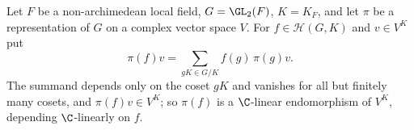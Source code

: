 Let $F$ be a non-archimedean local field, $G=\GL_2(F)$, $K=K_F$, and let $\pi$ be a representation of $G$ on a complex
vector space $V$. For $f\in\mathcal H(G,K)$ and $v\in V^K$ put
\[
  \pi(f)v=\sum_{gK\in G/K}f(g)\,\pi(g)v .
\]
The summand depends only on the coset $gK$ and vanishes for all but finitely many cosets, and $\pi(f)v\in V^K$; so
$\pi(f)$ is a $\C$-linear endomorphism of $V^K$, depending $\C$-linearly on $f$.
